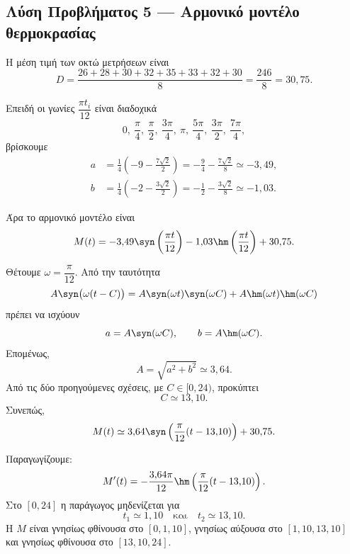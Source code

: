 \subsection*{Λύση Προβλήματος 5 --- Αρμονικό μοντέλο θερμοκρασίας}

\begin{alist}
  \item Η μέση τιμή των οκτώ μετρήσεων είναι
        \[
          D=\frac{26+28+30+32+35+33+32+30}{8}
          =\frac{246}{8}
          =30{,}75.
        \]

        Επειδή οι γωνίες $\dfrac{\pi t_i}{12}$ είναι διαδοχικά
        \[
          0,\ \frac{\pi}{4},\ \frac{\pi}{2},\
          \frac{3\pi}{4},\ \pi,\ \frac{5\pi}{4},\
          \frac{3\pi}{2},\ \frac{7\pi}{4},
        \]
        βρίσκουμε
        \begin{align*}
          a
          &=\frac14\left(
             -9-\frac{7\sqrt2}{2}\right)
            =-\frac94-\frac{7\sqrt2}{8}
            \simeq-3{,}49,\\
          b
          &=\frac14\left(
             -2-\frac{3\sqrt2}{2}\right)
            =-\frac12-\frac{3\sqrt2}{8}
            \simeq-1{,}03.
        \end{align*}

        Άρα το αρμονικό μοντέλο είναι
        \[
          {
          M(t)=-3{,}49\syn\left(\frac{\pi t}{12}\right)
               -1{,}03\hm\left(\frac{\pi t}{12}\right)
               +30{,}75}.
        \]

  \item Θέτουμε $\omega=\dfrac{\pi}{12}$. Από την ταυτότητα
        \[
          A\syn\bigl(\omega(t-C)\bigr)
          =A\syn(\omega t)\syn(\omega C)
           +A\hm(\omega t)\hm(\omega C)
        \]
        πρέπει να ισχύουν
        \[
          a=A\syn(\omega C),
          \qquad
          b=A\hm(\omega C).
        \]
        Επομένως,
        \[
          A=\sqrt{a^2+b^2}
          \simeq3{,}64.
        \]
        Από τις δύο προηγούμενες σχέσεις, με $C\in[0,24)$, προκύπτει
        \[
          C\simeq13{,}10.
        \]
        Συνεπώς,
        \[
          {
          M(t)\simeq
          3{,}64\syn\left(\frac{\pi}{12}(t-13{,}10)\right)
          +30{,}75}.
        \]

  \item Παραγωγίζουμε:
        \[
          M'(t)
          =-\frac{3{,}64\pi}{12}
           \hm\left(\frac{\pi}{12}(t-13{,}10)\right).
        \]
        Στο $[0,24]$ η παράγωγος μηδενίζεται για
        \[
          t_1\simeq1{,}10
          \quad\text{και}\quad
          t_2\simeq13{,}10.
        \]
        Η $M$ είναι γνησίως φθίνουσα στο $[0,1{,}10]$, γνησίως
        αύξουσα στο $[1{,}10,13{,}10]$ και γνησίως φθίνουσα στο
        $[13{,}10,24]$.


\end{alist}
